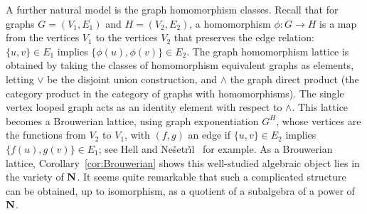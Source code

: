 \documentclass[eqnor,reqno]{amsart}
\theoremstyle{plain}
\theoremstyle{definition}
\begin{document}
A further natural model is the graph homomorphism classes.
Recall that for graphs $G=(V_1,E_1)$ and $H=(V_2,E_2)$, a homomorphism $\phi:G\to H$ is a map from the vertices $V_1$ to the vertices $V_2$ that preserves the edge relation: $\{u,v\}\in E_1$ implies $\{\phi(u),\phi(v)\}\in E_2$.
The graph homomorphism lattice is obtained by taking the classes of homomorphism equivalent graphs as elements, letting $\vee$ be the disjoint union construction, and $\wedge$ the graph direct product (the category product in the category of graphs with homomorphisms).  The single vertex looped graph acts as an identity element with respect to $\wedge$.
This lattice becomes a Brouwerian lattice, using graph exponentiation $G^H$, whose vertices are the functions from $V_2$ to $V_1$, with $(f,g)$ an edge if $\{u,v\}\in E_2$ implies $\{f(u),g(v)\}\in E_1$; see Hell and Ne\v{s}etr\v{\i}l~\cite[\S2.5]{helnes} for example.
As a Brouwerian lattice, Corollary~\ref{cor:Brouwerian} shows this well-studied algebraic object lies in the variety of ${\bf N}$.    
It seems quite remarkable that such a complicated structure can be obtained, up to isomorphism, as a quotient of a subalgebra of a power of ${\bf N}$.
\end{document}

